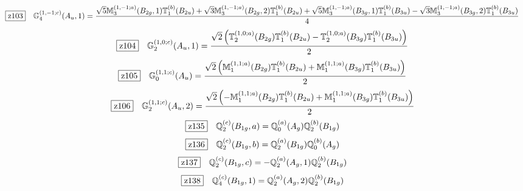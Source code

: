 \documentclass[fleqn,10pt,landscape]{jsarticle}
\begin{document}
\begin{dmath*}
\hspace*{3mm}\fbox{z103}\quad \mathbb{G}_{4}^{(1,-1;c)}(A_{u},1)=\frac{\sqrt{5} \mathbb{M}_{3}^{(1,-1;a)}(B_{2g},1) \mathbb{T}_{1}^{(b)}(B_{2u}) + \sqrt{3} \mathbb{M}_{3}^{(1,-1;a)}(B_{2g},2) \mathbb{T}_{1}^{(b)}(B_{2u}) + \sqrt{5} \mathbb{M}_{3}^{(1,-1;a)}(B_{3g},1) \mathbb{T}_{1}^{(b)}(B_{3u}) - \sqrt{3} \mathbb{M}_{3}^{(1,-1;a)}(B_{3g},2) \mathbb{T}_{1}^{(b)}(B_{3u})}{4}
\end{dmath*}
\begin{dmath*}
\hspace*{3mm}\fbox{z104}\quad \mathbb{G}_{2}^{(1,0;c)}(A_{u},1)=\frac{\sqrt{2} \left(\mathbb{T}_{2}^{(1,0;a)}(B_{2g}) \mathbb{T}_{1}^{(b)}(B_{2u}) - \mathbb{T}_{2}^{(1,0;a)}(B_{3g}) \mathbb{T}_{1}^{(b)}(B_{3u})\right)}{2}
\end{dmath*}
\begin{dmath*}
\hspace*{3mm}\fbox{z105}\quad \mathbb{G}_{0}^{(1,1;c)}(A_{u})=\frac{\sqrt{2} \left(\mathbb{M}_{1}^{(1,1;a)}(B_{2g}) \mathbb{T}_{1}^{(b)}(B_{2u}) + \mathbb{M}_{1}^{(1,1;a)}(B_{3g}) \mathbb{T}_{1}^{(b)}(B_{3u})\right)}{2}
\end{dmath*}
\begin{dmath*}
\hspace*{3mm}\fbox{z106}\quad \mathbb{G}_{2}^{(1,1;c)}(A_{u},2)=\frac{\sqrt{2} \left(- \mathbb{M}_{1}^{(1,1;a)}(B_{2g}) \mathbb{T}_{1}^{(b)}(B_{2u}) + \mathbb{M}_{1}^{(1,1;a)}(B_{3g}) \mathbb{T}_{1}^{(b)}(B_{3u})\right)}{2}
\end{dmath*}
\begin{dmath*}
\hspace*{3mm}\fbox{z135}\quad \mathbb{Q}_{2}^{(c)}(B_{1g},a)=\mathbb{Q}_{0}^{(a)}(A_{g}) \mathbb{Q}_{2}^{(b)}(B_{1g})
\end{dmath*}
\begin{dmath*}
\hspace*{3mm}\fbox{z136}\quad \mathbb{Q}_{2}^{(c)}(B_{1g},b)=\mathbb{Q}_{2}^{(a)}(B_{1g}) \mathbb{Q}_{0}^{(b)}(A_{g})
\end{dmath*}
\begin{dmath*}
\hspace*{3mm}\fbox{z137}\quad \mathbb{Q}_{2}^{(c)}(B_{1g},c)=- \mathbb{Q}_{2}^{(a)}(A_{g},1) \mathbb{Q}_{2}^{(b)}(B_{1g})
\end{dmath*}
\begin{dmath*}
\hspace*{3mm}\fbox{z138}\quad \mathbb{Q}_{4}^{(c)}(B_{1g},1)=\mathbb{Q}_{2}^{(a)}(A_{g},2) \mathbb{Q}_{2}^{(b)}(B_{1g})
\end{dmath*}
\end{document}
